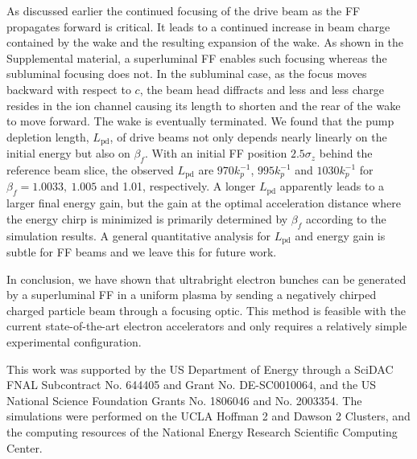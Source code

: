 \documentclass[
aps,
prl,
reprint,
superscriptaddress,
amsmath,
amssymb,
showpacs
]{revtex4-2}
\begin{document}
As discussed earlier the continued focusing of the drive beam as the FF propagates forward is critical. It leads to a continued increase in beam charge contained by the wake and the resulting expansion of the wake. As shown in the Supplemental material, a superluminal FF enables such focusing whereas the subluminal focusing does not. In the subluminal case, as the focus moves backward with respect to $c$, the beam head diffracts and less and less charge resides in the ion channel causing its length to shorten and the rear of the wake to move forward. The wake is eventually terminated.
We found that the pump depletion length, $L_\text{pd}$, of drive beams not only depends nearly linearly on the initial energy but also on $\beta_f$. With an initial FF position $2.5\sigma_z$ behind the reference beam slice, the observed $L_\text{pd}$ are $970k_p^{-1}$, $995k_p^{-1}$ and $1030k_p^{-1}$ for $\beta_f=1.0033,~1.005$ and 1.01, respectively. A longer $L_\text{pd}$ apparently leads to a larger final energy gain, but the gain at the optimal acceleration distance where the energy chirp is minimized is primarily determined by $\beta_f$ according to the simulation results. A general quantitative analysis for $L_\text{pd}$ and energy gain is subtle for FF beams and we leave this for future work.

In conclusion, we have shown that ultrabright electron bunches can be generated by a superluminal FF in a uniform plasma by sending a negatively chirped charged particle beam through a focusing optic. This method is feasible with the current state-of-the-art electron accelerators and only requires a relatively simple experimental configuration. 

\begin{acknowledgments}
This work was supported by the US Department of Energy through a SciDAC FNAL Subcontract No. 644405 and Grant No. DE-SC0010064, and the US National Science Foundation Grants No. 1806046 and No. 2003354. The simulations were performed on the UCLA Hoffman 2 and Dawson 2 Clusters, and the computing resources of the National Energy Research Scientific Computing Center. 
\end{acknowledgments}


\end{document}
